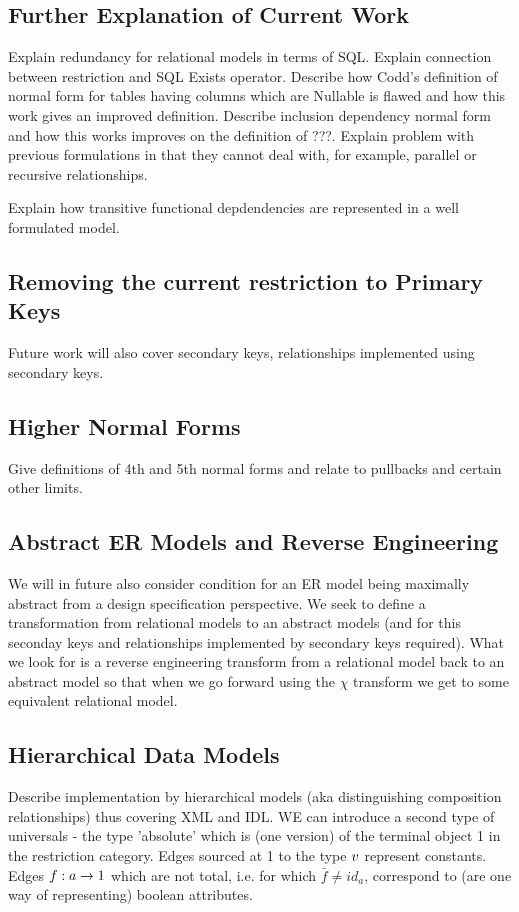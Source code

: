 \subsection{Further Explanation of Current Work}
Explain redundancy for relational models in terms of SQL. 
Explain connection between restriction and SQL Exists operator.
Describe how Codd's definition of normal form for tables having columns which are Nullable is flawed and how this work gives an improved definition. 
Describe inclusion dependency normal form and how this works improves on the definition of ???. Explain problem with previous formulations
in that they cannot deal with, for example, parallel or recursive relationships. 

Explain how transitive functional depdendencies are represented in a well formulated model. 

\subsection{Removing the current restriction to Primary Keys}
Future work will also cover secondary keys, relationships implemented using secondary keys.

\subsection{Higher Normal Forms}
Give definitions of 4th and 5th normal forms and relate to pullbacks and certain other limits.  

\subsection {Abstract ER Models and Reverse Engineering}
We will in future also consider condition for an ER model being maximally abstract from a design specification perspective. We seek to define a transformation from relational models to an abstract models (and for this seconday keys and relationships implemented by secondary keys required). What we look for is a reverse engineering transform from a relational model back to an abstract model so that when we go forward using the $\chi$ transform we get to some equivalent relational model.

\subsection{Hierarchical Data Models}
Describe implementation by hierarchical models (aka distinguishing composition relationships) thus covering XML and IDL.
WE can introduce a second type of universals - the type 'absolute' which is (one version) of the terminal object 1 in the restriction
category. Edges sourced at 1 to the type $v$ represent constants. Edges $f: a \rightarrow 1$ which are not total, i.e. for which
$\bar{f} \neq id_a$, correspond to (are one way of representing) boolean attributes.  

